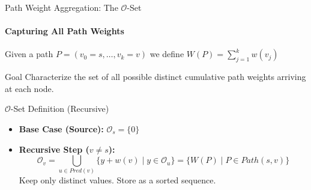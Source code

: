 \begin{frame}{Path Weight Aggregation: The $\mathcal{O}$-Set}
    \framesubtitle{Capturing All Path Weights}
    Given a path $P=(v_0=s, \dots, v_k=v)$ we define $W(P) = \sum_{j=1}^{k} w(v_j)$
    \begin{alertblock}{Goal}
        Characterize the set of \alert{all possible distinct} cumulative path weights arriving at each node.
    \end{alertblock}
    \pause
    \begin{block}{$\mathcal{O}$-Set Definition (Recursive)}
        \begin{itemize}
            \item \textbf{Base Case (Source):} $\mathcal{O}_s = \{0\}$
            \item \textbf{Recursive Step ($v \neq s$):}
                  \[ \mathcal{O}_v = \bigcup_{u \in Pred(v)} \{ y + w(v) \mid y \in \mathcal{O}_u \} = \{ W(P) \mid P \in Path(s, v) \}  \]
                  Keep only \alert{distinct} values. Store as a sorted sequence.
        \end{itemize}
    \end{block}

\end{frame}

